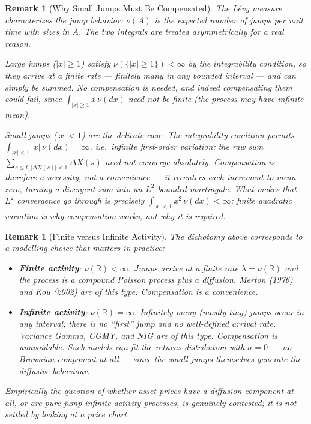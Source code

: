 \documentclass{report}
\theoremstyle{spacedplain}
\theoremstyle{spaceddefinition}
\theoremstyle{spacedremark}
\newtheorem{remark}[theorem]{Remark}
\begin{document}
\begin{remark}[Why Small Jumps Must Be Compensated]
The L\'evy measure characterizes the jump behavior: $\nu(A)$ is the expected number of jumps per unit time with sizes in $A$. The two integrals are treated asymmetrically for a real reason.

Large jumps ($|x| \geq 1$) satisfy $\nu(\{|x| \geq 1\}) < \infty$ by the integrability condition, so they arrive at a finite rate --- finitely many in any bounded interval --- and can simply be summed. No compensation is needed, and indeed compensating them could fail, since $\int_{|x|\geq 1} x\,\nu(dx)$ need not be finite (the process may have infinite mean).

Small jumps ($|x| < 1$) are the delicate case. The integrability condition permits $\int_{|x|<1} |x|\,\nu(dx) = \infty$, i.e.\ \emph{infinite first-order variation}: the raw sum $\sum_{s \leq t, |\Delta X(s)| < 1} \Delta X(s)$ need not converge absolutely. Compensation is therefore a \emph{necessity}, not a convenience --- it recenters each increment to mean zero, turning a divergent sum into an $L^2$-bounded martingale. What makes that $L^2$ convergence go through is precisely $\int_{|x|<1} x^2\,\nu(dx) < \infty$: finite quadratic variation is why compensation \emph{works}, not why it is \emph{required}.
\end{remark}

\begin{remark}[Finite versus Infinite Activity]
The dichotomy above corresponds to a modelling choice that matters in practice:
\begin{itemize}[noitemsep]
    \item \textbf{Finite activity}: $\nu(\mathbb{R}) < \infty$. Jumps arrive at a finite rate $\lambda = \nu(\mathbb{R})$ and the process is a compound Poisson process plus a diffusion. Merton (1976) and Kou (2002) are of this type. Compensation is a convenience.
    \item \textbf{Infinite activity}: $\nu(\mathbb{R}) = \infty$. Infinitely many (mostly tiny) jumps occur in any interval; there is no ``first'' jump and no well-defined arrival rate. Variance Gamma, CGMY, and NIG are of this type. Compensation is unavoidable. Such models can fit the returns distribution with $\sigma = 0$ --- no Brownian component at all --- since the small jumps themselves generate the diffusive behaviour.
\end{itemize}
Empirically the question of whether asset prices have a diffusion component at all, or are pure-jump infinite-activity processes, is genuinely contested; it is not settled by looking at a price chart.
\end{remark}
\end{document}

